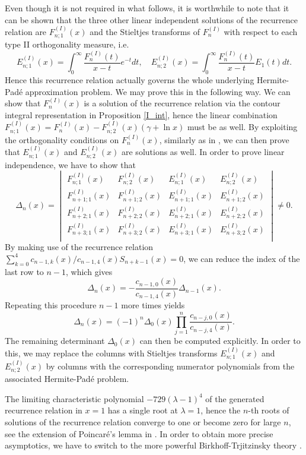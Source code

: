 \documentclass[a4paper,12pt,oneside]{article}
\theoremstyle{definition}
\begin{document}
Even though it is not required in what follows, it is worthwhile to note that it can be shown that the three other linear independent solutions of the recurrence relation are $F_{n;1}^{(I)}(x)$ and the Stieltjes transforms of $F_{n}^{(I)}$ with respect to each type II orthogonality measure, i.e.
    $$E_{n;1}^{(I)}(x) = \int_0^\infty \frac{F_{n}^{(I)}(t)}{x-t} e^{-t} dt ,\quad E_{n;2}^{(I)}(x) = \int_0^\infty \frac{F_{n}^{(I)}(t)}{x-t} E_{1}(t) dt.$$
Hence this recurrence relation actually governs the whole underlying Hermite-Padé approximation problem. We may prove this in the following way. We can show that $F_{n}^{(I)}(x)$ is a solution of the recurrence relation via the contour integral representation in Proposition \ref{I_int}, hence the linear combination $F_{n;1}^{(I)}(x)=F_{n}^{(I)}(x)-F_{n;2}^{(I)}(x)(\gamma+\ln x)$ must be as well. By exploiting the orthogonality conditions on $F_{n}^{(I)}(x)$, similarly as in \cite[Proposition 7]{Riv}, we can then prove that $E_{n;1}^{(I)}(x)$ and $E_{n;2}^{(I)}(x)$ are solutions as well. In order to prove linear independence, we have to show that
    $$ \Delta_n(x) = \begin{vmatrix} F_{n;1}^{(I)}(x) & F_{n;2}^{(I)}(x) & E_{n;1}^{(I)}(x) & E_{n;2}^{(I)}(x) \\ 
    F_{n+1;1}^{(I)}(x) & F_{n+1;2}^{(I)}(x) & E_{n+1;1}^{(I)}(x) & E_{n+1;2}^{(I)}(x) \\  
    F_{n+2;1}^{(I)}(x) & F_{n+2;2}^{(I)}(x) & E_{n+2;1}^{(I)}(x) & E_{n+2;2}^{(I)}(x) \\ 
    F_{n+3;1}^{(I)}(x) & F_{n+3;2}^{(I)}(x) & E_{n+3;1}^{(I)}(x) & E_{n+3;2}^{(I)}(x) \\  \end{vmatrix} \neq 0.$$ 
By making use of the recurrence relation $\sum_{k=0}^4 c_{n-1,k}(x)/c_{n-1,4}(x)  S_{n+k-1}(x)=0$, we can reduce the index of the last row to $n-1$, which gives 
    $$\Delta_n(x) = - \frac{c_{n-1,0}(x)}{c_{n-1,4}(x)} \Delta_{n-1}(x).$$
Repeating this procedure $n-1$ more times yields
    $$ \Delta_n(x) = (-1)^n \Delta_{0}(x) \prod_{j=1}^{n} \frac{c_{n-j,0}(x)}{c_{n-j,4}(x)} . $$    
The remaining determinant $\Delta_{0}(x)$ can then be computed explicitly. In order to this, we may replace the columns with Stieltjes transforms $E_{n;1}^{(I)}(x)$ and $E_{n;2}^{(I)}(x)$ by columns with the corresponding numerator polynomials from the associated Hermite-Padé problem.
\medbreak

The limiting characteristic polynomial $-729(\lambda-1)^4$ of the generated recurrence relation in $x=1$ has a single root at $\lambda=1$, hence the $n$-th roots of solutions of the recurrence relation converge to one or become zero for large $n$, see the extension of Poincaré's lemma in \cite{Pituk}. In order to obtain more precise asymptotics, we have to switch to the more powerful Birkhoff-Trjitzinsky theory \cite{BT}.
\end{document}
